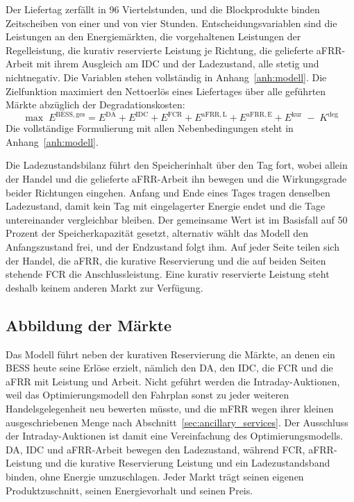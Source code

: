 Der Liefertag zerfällt in 96 Viertelstunden, und die Blockprodukte binden Zeitscheiben von einer und von vier Stunden.
Entscheidungsvariablen sind die Leistungen an den Energiemärkten, die vorgehaltenen Leistungen der Regelleistung, die kurativ reservierte Leistung je Richtung, die gelieferte \ac{aFRR}-Arbeit mit ihrem Ausgleich am \ac{IDC} und der Ladezustand, alle stetig und nichtnegativ.
Die Variablen stehen vollständig in Anhang~\ref{anh:modell}.
Die Zielfunktion maximiert den Nettoerlös eines Liefertages über alle geführten Märkte abzüglich der Degradationskosten:
\begin{equation}
    \label{eq:zielfunktion}
    \max \; E^{\mathrm{BESS,ges}} = E^{\mathrm{DA}} + E^{\mathrm{IDC}} + E^{\mathrm{FCR}} + E^{\mathrm{aFRR,L}} + E^{\mathrm{aFRR,E}} + E^{\mathrm{kur}} \; - \; K^{\mathrm{deg}}
\end{equation}
Die vollständige Formulierung mit allen Nebenbedingungen steht in Anhang~\ref{anh:modell}.

Die Ladezustandsbilanz führt den Speicherinhalt über den Tag fort, wobei allein der Handel und die gelieferte \ac{aFRR}-Arbeit ihn bewegen und die Wirkungsgrade beider Richtungen eingehen.
Anfang und Ende eines Tages tragen denselben Ladezustand, damit kein Tag mit eingelagerter Energie endet und die Tage untereinander vergleichbar bleiben.
Der gemeinsame Wert ist im Basisfall auf 50 Prozent der Speicherkapazität gesetzt, alternativ wählt das Modell den Anfangszustand frei, und der Endzustand folgt ihm.
Auf jeder Seite teilen sich der Handel, die \ac{aFRR}, die kurative Reservierung und die auf beiden Seiten stehende \ac{FCR} die Anschlussleistung.
Eine kurativ reservierte Leistung steht deshalb keinem anderen Markt zur Verfügung.

\subsection{Abbildung der Märkte}
\label{sec:input_data}
\label{sec:constraints}

Das Modell führt neben der kurativen Reservierung die Märkte, an denen ein \ac{BESS} heute seine Erlöse erzielt, nämlich den \ac{DA}, den \ac{IDC}, die \ac{FCR} und die \ac{aFRR} mit Leistung und Arbeit.
Nicht geführt werden die Intraday-Auktionen, weil das Optimierungsmodell den Fahrplan sonst zu jeder weiteren Handelsgelegenheit neu bewerten müsste, und die \ac{mFRR} wegen ihrer kleinen ausgeschriebenen Menge nach Abschnitt~\ref{sec:ancillary_services}.
Der Ausschluss der Intraday-Auktionen ist damit eine Vereinfachung des Optimierungsmodells.
\ac{DA}, \ac{IDC} und \ac{aFRR}-Arbeit bewegen den Ladezustand, während \ac{FCR}, \ac{aFRR}-Leistung und die kurative Reservierung Leistung und ein Ladezustandsband binden, ohne Energie umzuschlagen.
Jeder Markt trägt seinen eigenen Produktzuschnitt, seinen Energievorhalt und seinen Preis.

